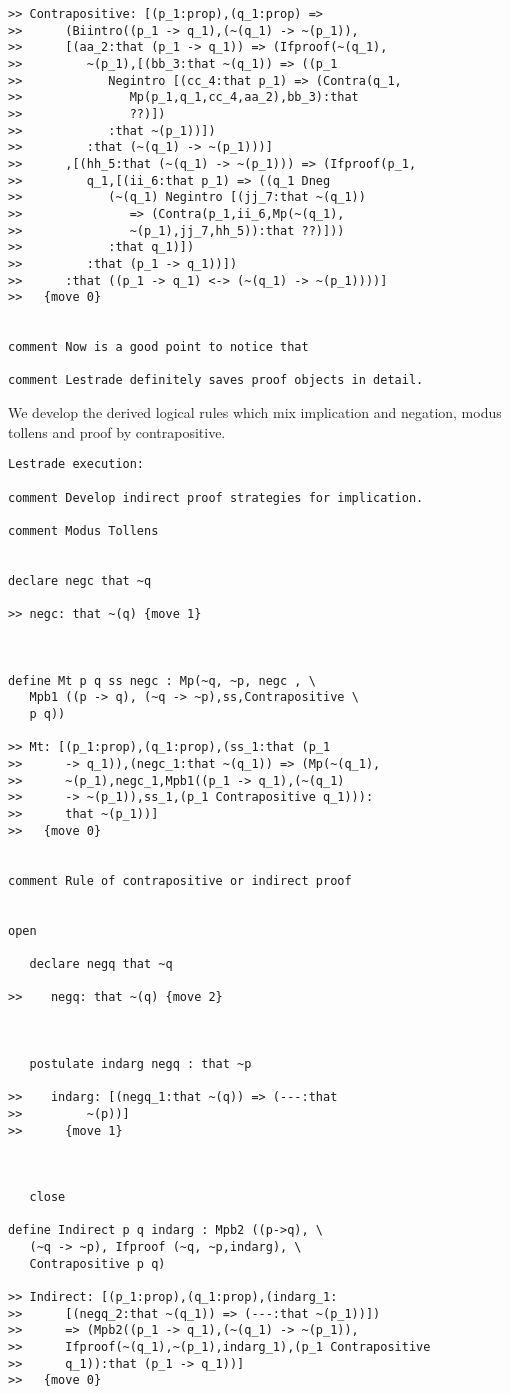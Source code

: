 \documentclass[12pt]{article}
\begin{document}
\begin{verbatim}
>> Contrapositive: [(p_1:prop),(q_1:prop) =>
>>      (Biintro((p_1 -> q_1),(~(q_1) -> ~(p_1)),
>>      [(aa_2:that (p_1 -> q_1)) => (Ifproof(~(q_1),
>>         ~(p_1),[(bb_3:that ~(q_1)) => ((p_1
>>            Negintro [(cc_4:that p_1) => (Contra(q_1,
>>               Mp(p_1,q_1,cc_4,aa_2),bb_3):that
>>               ??)])
>>            :that ~(p_1))])
>>         :that (~(q_1) -> ~(p_1)))]
>>      ,[(hh_5:that (~(q_1) -> ~(p_1))) => (Ifproof(p_1,
>>         q_1,[(ii_6:that p_1) => ((q_1 Dneg
>>            (~(q_1) Negintro [(jj_7:that ~(q_1))
>>               => (Contra(p_1,ii_6,Mp(~(q_1),
>>               ~(p_1),jj_7,hh_5)):that ??)]))
>>            :that q_1)])
>>         :that (p_1 -> q_1))])
>>      :that ((p_1 -> q_1) <-> (~(q_1) -> ~(p_1))))]
>>   {move 0}


comment Now is a good point to notice that

comment Lestrade definitely saves proof objects in detail.

\end{verbatim}

We develop the derived logical rules which mix implication and negation, modus tollens and proof by contrapositive.

\begin{verbatim}Lestrade execution:

comment Develop indirect proof strategies for implication.

comment Modus Tollens


declare negc that ~q

>> negc: that ~(q) {move 1}



define Mt p q ss negc : Mp(~q, ~p, negc , \
   Mpb1 ((p -> q), (~q -> ~p),ss,Contrapositive \
   p q))

>> Mt: [(p_1:prop),(q_1:prop),(ss_1:that (p_1
>>      -> q_1)),(negc_1:that ~(q_1)) => (Mp(~(q_1),
>>      ~(p_1),negc_1,Mpb1((p_1 -> q_1),(~(q_1)
>>      -> ~(p_1)),ss_1,(p_1 Contrapositive q_1))):
>>      that ~(p_1))]
>>   {move 0}


comment Rule of contrapositive or indirect proof


open

   declare negq that ~q

>>    negq: that ~(q) {move 2}



   postulate indarg negq : that ~p

>>    indarg: [(negq_1:that ~(q)) => (---:that
>>         ~(p))]
>>      {move 1}



   close

define Indirect p q indarg : Mpb2 ((p->q), \
   (~q -> ~p), Ifproof (~q, ~p,indarg), \
   Contrapositive p q)

>> Indirect: [(p_1:prop),(q_1:prop),(indarg_1:
>>      [(negq_2:that ~(q_1)) => (---:that ~(p_1))])
>>      => (Mpb2((p_1 -> q_1),(~(q_1) -> ~(p_1)),
>>      Ifproof(~(q_1),~(p_1),indarg_1),(p_1 Contrapositive
>>      q_1)):that (p_1 -> q_1))]
>>   {move 0}


\end{verbatim}
\end{document}

